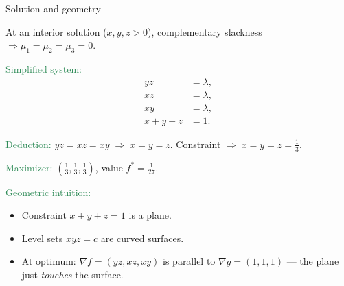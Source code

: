 \documentclass{beamer}
\begin{document}
\begin{frame}{Solution and geometry}

At an interior solution ($x,y,z>0$), complementary slackness $\Rightarrow \mu_1=\mu_2=\mu_3=0$.  

\medskip
\textcolor{SeaGreen}{Simplified system:}
\[
\begin{aligned}
yz&=\lambda,\\
xz&=\lambda,\\
xy&=\lambda,\\
x+y+z&=1.
\end{aligned}
\]

\textcolor{SeaGreen}{Deduction:}  
$yz=xz=xy \;\Rightarrow\; x=y=z$.  
Constraint $\Rightarrow\; x=y=z=\tfrac13$.

\medskip
\textcolor{SeaGreen}{Maximizer:} $(\tfrac13,\tfrac13,\tfrac13)$, value $f^\ast=\tfrac1{27}$.

\medskip
\textcolor{SeaGreen}{Geometric intuition:}
\begin{itemize}
\item Constraint $x+y+z=1$ is a plane.
\item Level sets $xyz=c$ are curved surfaces.
\item At optimum: $\nabla f=(yz,xz,xy)$ is parallel to $\nabla g=(1,1,1)$ — the plane just \emph{touches} the surface.
\end{itemize}
\end{frame}
\end{document}
